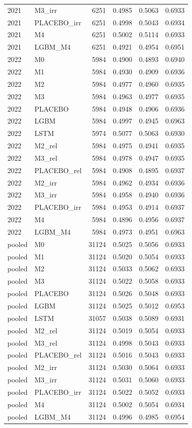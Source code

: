 \begin{tabular}{llrrrr}
2021 & M3\_irr & 6251 & 0.4985 & 0.5063 & 0.6933 \\
2021 & PLACEBO\_irr & 6251 & 0.4998 & 0.5043 & 0.6934 \\
2021 & M4 & 6251 & 0.5002 & 0.5114 & 0.6933 \\
2021 & LGBM\_M4 & 6251 & 0.4921 & 0.4954 & 0.6951 \\
2022 & M0 & 5984 & 0.4900 & 0.4893 & 0.6940 \\
2022 & M1 & 5984 & 0.4930 & 0.4909 & 0.6936 \\
2022 & M2 & 5984 & 0.4977 & 0.4960 & 0.6935 \\
2022 & M3 & 5984 & 0.4963 & 0.4977 & 0.6935 \\
2022 & PLACEBO & 5984 & 0.4948 & 0.4906 & 0.6936 \\
2022 & LGBM & 5984 & 0.4997 & 0.4945 & 0.6963 \\
2022 & LSTM & 5974 & 0.5077 & 0.5063 & 0.6930 \\
2022 & M2\_rel & 5984 & 0.4975 & 0.4941 & 0.6935 \\
2022 & M3\_rel & 5984 & 0.4978 & 0.4947 & 0.6935 \\
2022 & PLACEBO\_rel & 5984 & 0.4908 & 0.4895 & 0.6937 \\
2022 & M2\_irr & 5984 & 0.4962 & 0.4934 & 0.6936 \\
2022 & M3\_irr & 5984 & 0.4958 & 0.4940 & 0.6936 \\
2022 & PLACEBO\_irr & 5984 & 0.4953 & 0.4914 & 0.6937 \\
2022 & M4 & 5984 & 0.4896 & 0.4956 & 0.6937 \\
2022 & LGBM\_M4 & 5984 & 0.4973 & 0.4951 & 0.6963 \\
pooled & M0 & 31124 & 0.5025 & 0.5056 & 0.6933 \\
pooled & M1 & 31124 & 0.5020 & 0.5054 & 0.6933 \\
pooled & M2 & 31124 & 0.5033 & 0.5062 & 0.6933 \\
pooled & M3 & 31124 & 0.5022 & 0.5058 & 0.6933 \\
pooled & PLACEBO & 31124 & 0.5026 & 0.5048 & 0.6933 \\
pooled & LGBM & 31124 & 0.5025 & 0.5012 & 0.6953 \\
pooled & LSTM & 31057 & 0.5038 & 0.5089 & 0.6931 \\
pooled & M2\_rel & 31124 & 0.5019 & 0.5054 & 0.6933 \\
pooled & M3\_rel & 31124 & 0.4998 & 0.5043 & 0.6933 \\
pooled & PLACEBO\_rel & 31124 & 0.5016 & 0.5043 & 0.6933 \\
pooled & M2\_irr & 31124 & 0.5030 & 0.5064 & 0.6933 \\
pooled & M3\_irr & 31124 & 0.5031 & 0.5060 & 0.6933 \\
pooled & PLACEBO\_irr & 31124 & 0.5022 & 0.5052 & 0.6933 \\
pooled & M4 & 31124 & 0.5002 & 0.5054 & 0.6934 \\
pooled & LGBM\_M4 & 31124 & 0.4996 & 0.4985 & 0.6954 \\
\bottomrule
\end{tabular}
